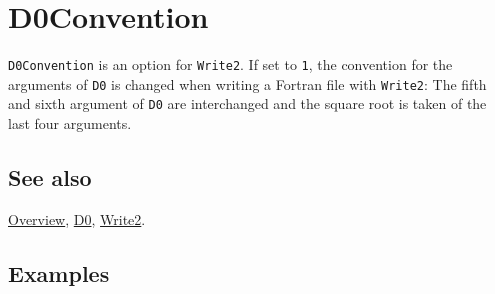 \documentclass[../FeynCalcManual.tex]{subfiles}
\begin{document}
\hypertarget{d0convention}{%
\section{D0Convention}\label{d0convention}}

\texttt{D0Convention} is an option for \texttt{Write2}. If set to
\texttt{1}, the convention for the arguments of \texttt{D0} is changed
when writing a Fortran file with \texttt{Write2}: The fifth and sixth
argument of \texttt{D0} are interchanged and the square root is taken of
the last four arguments.

\subsection{See also}

\hyperlink{toc}{Overview}, \hyperlink{d0}{D0},
\hyperlink{write2}{Write2}.

\subsection{Examples}
\end{document}
